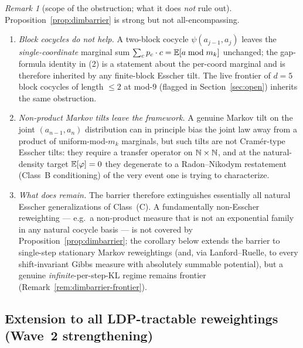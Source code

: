 \documentclass[11pt]{amsart}
\theoremstyle{definition}
\theoremstyle{remark}
\newtheorem{remark}[theorem]{Remark}
\begin{document}
\begin{remark}[scope of the obstruction; what it does \emph{not} rule out]\label{rem:dimbarrier-scope}
Proposition~\ref{prop:dimbarrier} is strong but not all-encompassing.
\begin{enumerate}[label=\textup{(\roman*)},leftmargin=*]
\item \emph{Block cocycles do not help.} A two-block cocycle $\psi(a_{j-1},a_j)$ leaves the
\emph{single-coordinate} marginal sum $\sum_c p_c\cdot c=\mathbb{E}[a\bmod m_k]$ unchanged; the gap-formula
identity in (2) is a statement about the per-coord marginal and is therefore inherited by any
finite-block Esscher tilt. The live frontier of $d=5$ block cocycles of length $\le 2$ at mod-$9$
(flagged in Section~\ref{sec:open}) inherits the same obstruction.
\item \emph{Non-product Markov tilts leave the framework.} A genuine Markov tilt on the joint
$(a_{n-1},a_n)$ distribution can in principle bias the joint law away from a product of uniform-mod-$m_k$
marginals, but such tilts are not Cram\'er-type Esscher tilts: they require a transfer operator on
$\mathbb{N}\times\mathbb{N}$, and at the natural-density target $\mathbb{E}[\varphi]=0$ they degenerate to a
Radon--Nikodym restatement (Class~B conditioning) of the very event one is trying to characterize.
\item \emph{What does remain.} The barrier therefore extinguishes essentially all natural Esscher
generalizations of Class~(C). A fundamentally non-Esscher reweighting --- e.g.\ a non-product
measure that is not an exponential family in any natural cocycle basis --- is not covered by
Proposition~\ref{prop:dimbarrier}; the corollary below extends the barrier to single-step
stationary Markov reweightings (and, via Lanford--Ruelle, to every shift-invariant Gibbs measure
with absolutely summable potential), but a genuine \emph{infinite}-per-step-KL regime remains
frontier (Remark~\ref{rem:dimbarrier-frontier}).
\end{enumerate}
\end{remark}

\subsection{Extension to all LDP-tractable reweightings (Wave~2 strengthening)}
\end{document}
